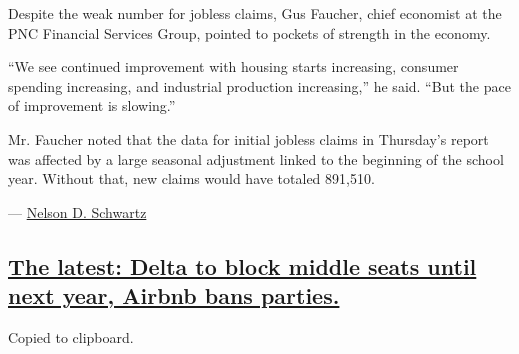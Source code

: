 Despite the weak number for jobless claims, Gus Faucher, chief economist
at the PNC Financial Services Group, pointed to pockets of strength in
the economy.

``We see continued improvement with housing starts increasing, consumer
spending increasing, and industrial production increasing,'' he said.
``But the pace of improvement is slowing.''

Mr. Faucher noted that the data for initial jobless claims in Thursday's
report was affected by a large seasonal adjustment linked to the
beginning of the school year. Without that, new claims would have
totaled 891,510.

---
\href{https://www.nytimes3xbfgragh.onion/by/nelson-d-schwartz}{Nelson D.
Schwartz}

\hypertarget{the-latest-delta-to-block-middle-seats-until-next-year-airbnb-bans-parties}{%
\subsection{\texorpdfstring{\protect\hyperlink{the-latest-delta-to-block-middle-seats-until-next-year-airbnb-bans-parties}{The
latest: Delta to block middle seats until next year, Airbnb bans
parties.}}{The latest: Delta to block middle seats until next year, Airbnb bans parties.}}\label{the-latest-delta-to-block-middle-seats-until-next-year-airbnb-bans-parties}}

Copied to clipboard.

